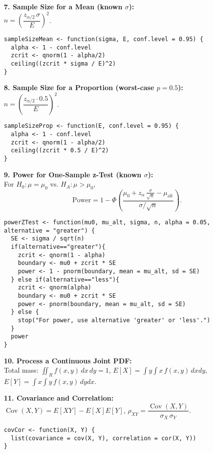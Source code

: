 \documentclass[10pt]{article}
\begin{document}
 

\noindent\textbf{7. Sample Size for a Mean (known $\sigma$):} \\
$n=\left(\dfrac{z_{\alpha/2}\,\sigma}{E}\right)^2$.

 

 
\begin{lstlisting}
sampleSizeMean <- function(sigma, E, conf.level = 0.95) {
  alpha <- 1 - conf.level
  zcrit <- qnorm(1 - alpha/2)
  ceiling((zcrit * sigma / E)^2)
}
\end{lstlisting}

 

\noindent\textbf{8. Sample Size for a Proportion (worst-case $p=0.5$):} \\
$n=\left(\dfrac{z_{\alpha/2}\cdot0.5}{E}\right)^2$.

 

 
\begin{lstlisting}
sampleSizeProp <- function(E, conf.level = 0.95) {
  alpha <- 1 - conf.level
  zcrit <- qnorm(1 - alpha/2)
  ceiling((zcrit * 0.5 / E)^2)
}
\end{lstlisting}

 

\noindent\textbf{9. Power for One-Sample z-Test (known $\sigma$):} \\
For $H_0:\mu=\mu_0$ vs. $H_A:\mu>\mu_0$,
\[
\text{Power} = 1-\Phi\!\left(\frac{\mu_0+z_{\alpha}\,\frac{\sigma}{\sqrt{n}}-\mu_{\text{alt}}}{\sigma/\sqrt{n}}\right).
\]

 

 
\begin{lstlisting}
powerZTest <- function(mu0, mu_alt, sigma, n, alpha = 0.05, alternative = "greater") {
  SE <- sigma / sqrt(n)
  if(alternative=="greater"){
    zcrit <- qnorm(1 - alpha)
    boundary <- mu0 + zcrit * SE
    power <- 1 - pnorm(boundary, mean = mu_alt, sd = SE)
  } else if(alternative=="less"){
    zcrit <- qnorm(alpha)
    boundary <- mu0 + zcrit * SE
    power <- pnorm(boundary, mean = mu_alt, sd = SE)
  } else {
    stop("For power, use alternative 'greater' or 'less'.")
  }
  power
}
\end{lstlisting}

 

\noindent\textbf{10. Process a Continuous Joint PDF:} \\
Total mass: $\displaystyle \iint_R f(x,y)\,dx\,dy=1$, \quad $E[X] = \int y\int x\,f(x,y)\,dxdy$, \quad $E[Y] = \int x\int y\,f(x,y)\,dydx$.

 

\noindent\textbf{11. Covariance and Correlation:} \\
$\operatorname{Cov}(X,Y)=E[XY]-E[X]E[Y]$, \quad $\rho_{XY} = \dfrac{\operatorname{Cov}(X,Y)}{\sigma_X\,\sigma_Y}$.

 

 
\begin{lstlisting}
covCor <- function(X, Y) {
  list(covariance = cov(X, Y), correlation = cor(X, Y))
}
\end{lstlisting}
\end{document}
